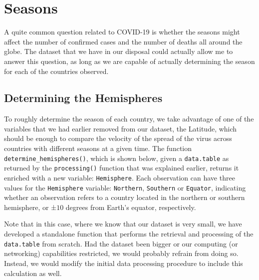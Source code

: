 \section{Seasons}

A quite common question related to COVID-19 is whether the seasons might affect the number of confirmed cases and the number of deaths all around the globe.
The dataset that we have in our disposal could actually allow me to answer this question, as long as we are capable of actually determining the season for each of the countries observed.


\subsection{Determining the Hemispheres}

To roughly determine the season of each country, we take advantage of one of the variables that we had earlier removed from our dataset, the Latitude, which should be enough to compare the velocity of the spread of the virus across countries with different seasons at a given time.
The function \texttt{determine\_hemispheres()}, which is shown below, given a \texttt{data.table} as returned by the \texttt{processing()} function that was explained earlier, returns it enriched with a new variable: \texttt{Hemisphere}.
Each observation can have three values for the \texttt{Hemisphere} variable: \texttt{Northern}, \texttt{Southern} or \texttt{Equator}, indicating whether an observation refers to a country located in the northern or southern hemisphere, or ±$10$ degrees from Earth's equator, respectively.

Note that in this case, where we know that our dataset is very small, we have developed a standalone function that performs the retrieval and processing of the \texttt{data.table} from scratch.
Had the dataset been bigger or our computing (or networking) capabilities restricted, we would probably refrain from doing so.
Instead, we would modify the initial data processing procedure to include this calculation as well.

